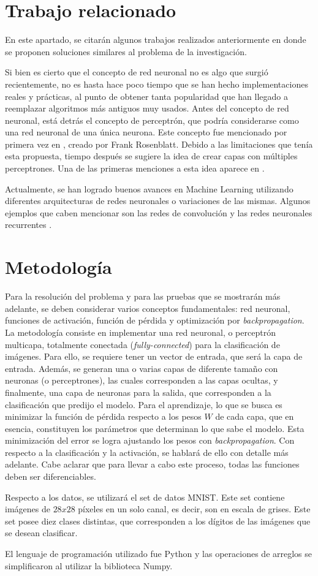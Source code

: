 \documentclass[journal]{IEEEtran}
\begin{document}
\section{Trabajo relacionado}
En este apartado, se citarán algunos trabajos realizados anteriormente en donde se proponen soluciones similares al problema de la investigación.
\par Si bien es cierto que el concepto de red neuronal no es algo que surgió recientemente, no es hasta hace poco tiempo que se han hecho implementaciones reales y prácticas, al punto de obtener tanta popularidad que han llegado a reemplazar algoritmos más antiguos muy usados. Antes del concepto de red neuronal, está detrás el concepto de perceptrón, que podría considerarse como una red neuronal de una única neurona. Este concepto fue mencionado por primera vez en \cite{Perceptron}, creado por Frank Rosenblatt. Debido a las limitaciones que tenía esta propuesta, tiempo después se sugiere la idea de crear capas con múltiples perceptrones. Una de las primeras menciones a esta idea aparece en \cite{percepBook}.
\par Actualmente, se han logrado buenos avances en Machine Learning utilizando diferentes arquitecturas de redes neuronales o variaciones de las mismas. Algunos ejemplos que caben mencionar son las redes de convolución \cite{convnet} y las redes neuronales recurrentes \cite{recnet}. 

\section{Metodología}
Para la resolución del problema y para las pruebas que se mostrarán más adelante, se deben considerar varios conceptos fundamentales: red neuronal, funciones de activación, 
función de pérdida y optimización por \textit{backpropagation}. La metodología consiste en implementar una red neuronal, o perceptrón multicapa, totalmente conectada (\textit{fully-connected}) para la clasificación de imágenes. Para ello, se requiere tener un vector de entrada, que será la capa de entrada. Además, se generan una o varias capas de diferente tamaño con neuronas (o perceptrones), las cuales corresponden a las capas ocultas, y finalmente, una capa de neuronas para la salida, que corresponden a la clasificación que predijo el modelo. Para el aprendizaje, lo que se busca es minimizar la función de pérdida respecto a los pesos $W$ de cada capa, que en esencia, constituyen los parámetros que determinan lo que sabe el modelo. Esta minimización del error se logra ajustando los pesos con \textit{backpropagation}. Con respecto a la clasificación y la activación, se hablará de ello con detalle más adelante. Cabe aclarar que para llevar a cabo este proceso, todas las funciones deben ser diferenciables. 
\par Respecto a los datos, se utilizará el set de datos MNIST. Este set contiene imágenes de $28x28$ píxeles en un solo canal, es decir, son en escala de grises. Este set posee diez clases distintas, que corresponden a los dígitos de las imágenes que se desean clasificar.
\par El lenguaje de programación utilizado fue Python y las operaciones de arreglos se simplificaron al utilizar la biblioteca Numpy.
\end{document}
